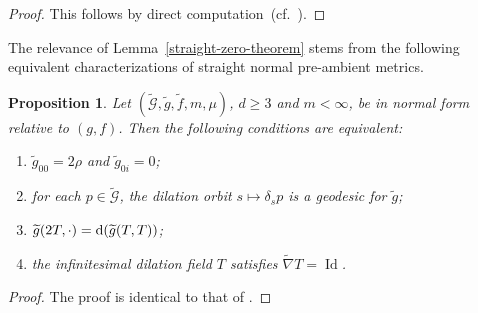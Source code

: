 \documentclass[pdftex]{sigma}
\numberwithin{equation}{section}
\newtheorem{Proposition}[Theorem]{Proposition}
 { \theoremstyle{definition}
\newtheorem{Definition}[Theorem]{Definition}
\newtheorem{Note}[Theorem]{Note}
\newtheorem{Example}[Theorem]{Example}
\newtheorem{Remark}[Theorem]{Remark} }
\begin{document}
\begin{proof}This follows by direct computation~(cf.\ \cite[Lemma 3.2]{FeffermanGraham2012}).
\end{proof}

The relevance of Lemma~\ref{straight-zero-theorem} stems from the following equivalent characterizations of straight normal pre-ambient metrics.
\begin{Proposition}
\label{straightproperties}
Let $(\widetilde{\mathcal{G}},\widetilde{g},\widetilde{f},m,\mu)$, $d\geq 3$ and $m<\infty$, be in normal form relative to $(g,f)$. Then the following conditions are equivalent:
\begin{enumerate}[label=$(\roman*)$]\itemsep=0pt
\item $\widetilde{g}_{00}=2\rho$ and $\widetilde{g}_{0i}=0$;

\item for each $p\in \widetilde{\mathcal{G}}$, the dilation orbit $s\mapsto \delta_s p$ is a geodesic for $\widetilde{g}$;

\item $\widetilde{g}(2T,\cdot)={\rm d}(\widetilde{g}(T,T))$;

\item the infinitesimal dilation field $T$ satisfies $\widetilde{\nabla}T=\operatorname{Id}$.
\end{enumerate}
\end{Proposition}

\begin{proof}
The proof is identical to that of \cite[Proposition 3.4]{FeffermanGraham2012}.
\end{proof}
\end{document}
